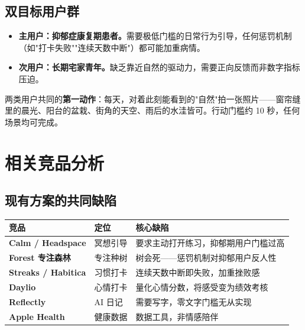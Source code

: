 \documentclass[11pt, a4paper]{article}
\newcommand{\kw}[1]{\textbf{#1}}
\begin{document}
\subsection*{双目标用户群}

\begin{itemize}
    \item \textbf{主用户：抑郁症康复期患者。}需要极低门槛的日常行为引导，任何惩罚机制（如"打卡失败""连续天数中断"）都可能加重病情。
    \item \textbf{次用户：长期宅家青年。}缺乏靠近自然的驱动力，需要正向反馈而非数字指标压迫。
\end{itemize}

两类用户共同的\kw{第一动作}：每天，对着此刻能看到的"自然"拍一张照片——窗帘缝里的晨光、阳台的盆栽、街角的天空、雨后的水洼皆可。行动门槛约 10 秒，任何场景均可完成。


\section{相关竞品分析}

\subsection*{现有方案的共同缺陷}

\begin{center}
\begin{tabularx}{\linewidth}{>{\bfseries}p{3.2cm} X X}
    \toprule
    \rowcolor{Row}
    竞品 & 定位 & 核心缺陷 \\
    \midrule
    Calm / Headspace  & 冥想引导 & 要求主动打开练习，抑郁期用户门槛过高 \\
    \rowcolor{Row}
    Forest 专注森林   & 专注种树 & 树会死——惩罚机制对抑郁用户反人性 \\
    Streaks / Habitica & 习惯打卡 & 连续天数中断即失败，加重挫败感 \\
    \rowcolor{Row}
    Daylio            & 心情打卡 & 量化心情分数，将感受变为绩效考核 \\
    Reflectly         & AI 日记  & 需要写字，零文字门槛无从实现 \\
    \rowcolor{Row}
    Apple Health      & 健康数据 & 数据工具，非情感陪伴 \\
    \bottomrule
\end{tabularx}
\end{center}
\end{document}
